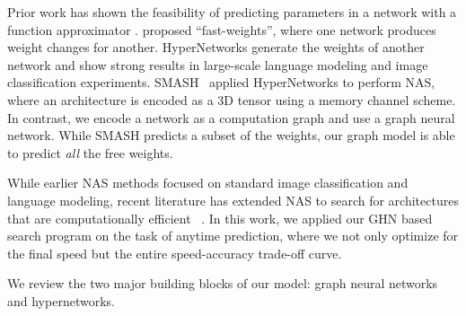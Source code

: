 \documentclass{article} %
\begin{document}
Prior work has shown the feasibility of predicting parameters in a network with a function
approximator \citep{denil2013predictparams}. \cite{Schmidhuber92Learning,schmidhuber1993self}
proposed ``fast-weights'', where one network produces weight changes for another. HyperNetworks
\citep{ha2016hypernetworks} generate the weights of another network and show strong results in
large-scale language modeling and image classification experiments. SMASH~\citep{brock2017smash}
applied HyperNetworks to perform NAS, where an architecture is encoded as a 3D tensor using a memory
channel scheme. In contrast, we encode a network as a computation graph and use a graph neural
network. While SMASH predicts a subset of the weights, our graph model is able to predict
\textit{all} the free weights.

While earlier NAS methods focused on standard image classification and language modeling, recent
literature has extended NAS to search for architectures that are computationally efficient
~\citep{tan2018mnasnet,dong2018dpp,hsu2018monas,elsken2018multi,zhou2018resource}. In this work, we
applied our GHN based search program on the task of anytime prediction, where we not only optimize
for the final speed but the entire speed-accuracy trade-off curve.

We review the two major building blocks of our model: graph neural networks and hypernetworks.
\end{document}
